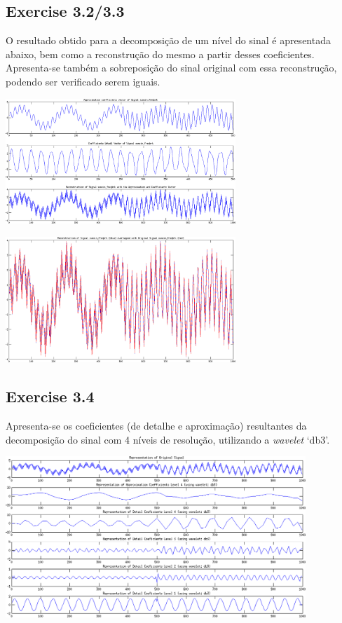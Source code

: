 \documentclass[a4paper]{article}
\begin{document}
\subsection{Exercise 3.2/3.3}
\indent \indent O resultado obtido para a decomposição de um nível do sinal é apresentada abaixo, bem como a reconstrução do mesmo a partir desses coeficientes. Apresenta-se também a sobreposição do sinal original com essa reconstrução, podendo ser verificado serem iguais.
\begin{center}
	\includegraphics[width=0.65\textwidth]{images/ex_3_2-3.png}
\end{center}
\begin{center}
	\includegraphics[width=0.65\textwidth]{images/ex_3_3_ep.png}
\end{center}

\subsection{Exercise 3.4}
\indent \indent Apresenta-se os coeficientes (de detalhe e aproximação) resultantes da decomposição do sinal com 4 níveis de resolução, utilizando a \emph{wavelet} `db3'.
\begin{center}
	\includegraphics[width=0.85\textwidth]{images/ex_3_4.png}
\end{center}
\end{document}
